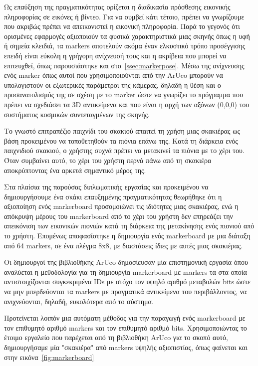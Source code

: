 Ως επαύξηση της πραγματικότητας ορίζεται η διαδικασία πρόσθεσης εικονικής πληροφορίας σε εικόνες ή βίντεο. Για να συμβεί κάτι τέτοιο, πρέπει να γνωρίζουμε που ακριβώς πρέπει να απεικονιστεί η εικονική πληροφορία. Παρά το γεγονός ότι ορισμένες εφαρμογές αξιοποιούν τα φυσικά χαρακτηριστικά μιας σκηνής όπως η υφή ή σημεία κλειδιά, τα markers αποτελούν ακόμα έναν ελκυστικό τρόπο προσέγγισης επειδή είναι εύκολη η γρήγορη ανίχνευσή τους και η ακρίβεια που μπορεί να επιτευχθεί, όπως παρουσιάστηκε και στο~\ref{ssec:markerpose}. Μέσω της ανίχνευσης ενός marker όπως αυτοί που χρησιμοποιούνται από την ArUco μπορούν να υπολογιστούν οι εξωτερικές παράμετροι της κάμερας, δηλαδή η θέση και ο προσανατολισμός της σε σχέση με το marker ώστε να γνωρίζει το πρόγραμμα που πρέπει να σχεδιάσει τα 3D αντικείμενα και που είναι η αρχή των αξόνων (0,0,0) του συστήματος κοσμικών συντεταγμένων της σκηνής. 



Το γνωστό επιτραπέζιο παιχνίδι του σκακιού απαιτεί τη χρήση μιας σκακιέρας ως βάση προκειμένου να τοποθετηθούν τα πιόνια επάνω της. Kατά τη διάρκεια ενός παιχνιδιού σκακιού, ο χρήστης συχνά πρέπει να μετακινεί τα πιόνια με το χέρι του. Όταν συμβαίνει αυτό, το χέρι του χρήστη περνά πάνω από τη σκακιέρα αποκρύπτοντας ένα αρκετά σημαντικό μέρος της. 


Στα πλαίσια της παρούσας διπλωματικής εργασίας και προκειμένου να δημιουργήσουμε ένα σκάκι επαυξημένης πραγματικότητας θεωρήθηκε ότι η αξιοποίηση ενός markerboard προσομοιώνει τις ιδιότητες μιας σκακιέρας, ενώ η απόκρυψη μέρους του markerboard από το χέρι του χρήστη δεν επηρεάζει την απεικόνιση των εικονικών πιονιών κατά τη διάρκεια της μετακίνησης ενός πιονιού από το χρήστη. Επομένως αποφασίστηκε η δημιουργία ενός markerboard με μια διάταξη από 64 markers, σε ένα πλέγμα 8x8, με διαστάσεις ίδιες με αυτές μιας σκακιέρας. 


Οι δημιουργοί της βιβλιοθήκης ArUco δημοσίευσαν μία επιστημονική εργασία \cite{garrido2014automatic} όπου αναλύεται η μεθοδολογία για τη δημιουργία markerboard με markers τα στα οποία αντιστοιχίζονται συγκεκριμένα IDs με στόχο τον υψηλό αριθμό μεταβολών bits ώστε να μην μπερδεύονται τα markers με πραγματικά αντικείμενα του περιβάλλοντος, να ανιχνεύονται, δηλαδή, ευκολότερα από το σύστημα. 

Προτείνεται λοιπόν μια αυτόματη μέθοδος για την παραγωγή ενός markerboard με τον επιθυμητό αριθμό markers και τον επιθυμητό αριθμό bits. Χρησιμοποιώντας το έτοιμο εργαλείο που παρέχεται από τη βιβλιοθήκη ArUco για το σκοπό αυτό, δημιουργήσαμε μία "σκακιέρα" από markers υψηλής αξιοπιστίας, όπως φαίνεται και στην εικόνα~\ref{fig:markerboard}




